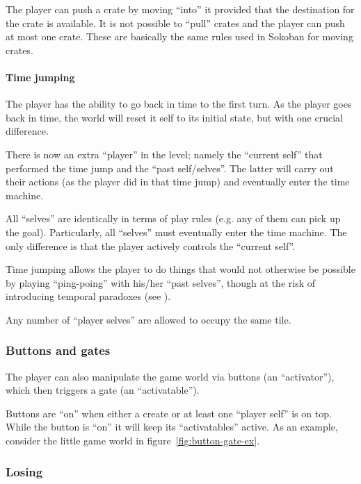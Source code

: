 The player can push a crate by moving ``into'' it provided that the
destination for the crate is available.  It is not possible to
``pull'' crates and the player can push at most one crate.  These
are basically the same rules used in Sokoban for moving crates.

\paragraph{Time jumping}
The player has the ability to go back in time to the first turn.  As
the player goes back in time, the world will reset it self to its
initial state, but with one crucial difference.

There is now an extra ``player'' in the level; namely the ``current
self'' that performed the time jump and the ``past self/selves''.  The
latter will carry out their actions (as the player did in that time
jump) and eventually enter the time machine.

All ``selves'' are identically in terms of play rules (e.g. any of
them can pick up the goal).  Particularly, all ``selves'' must
eventually enter the time machine.  The only difference is that the
player actively controls the ``current self''.

Time jumping allows the player to do things that would not otherwise
be possible by playing ``ping-poing'' with his/her ``past selves'',
though at the risk of introducing temporal paradoxes (see
).

Any number of ``player selves'' are allowed to occupy the same
tile.

\subsubsection{Buttons and gates}
The player can also manipulate the game world via buttons (an
``activator''), which then triggers a gate (an ``activatable'').

Buttons are ``on'' when either a create or at least one ``player
self'' is on top.  While the button is ``on'' it will keep its
``activatables'' active.  As an example, consider the little game
world in figure~\ref{fig:button-gate-ex}.




\subsubsection{Losing}

